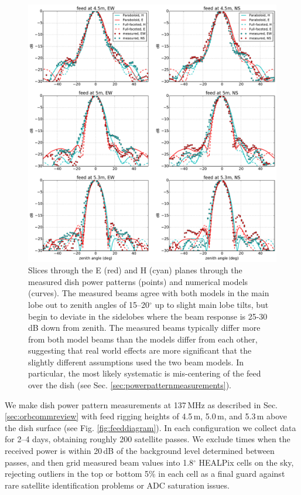 \begin{figure}[t]
\centering
\includegraphics[width=6in]{chap3_hera_beammapping/measured_beams_and_models_slices.pdf}
\caption[Slices through the E (red) and H (cyan) planes through the measured dish power patterns (points) and numerical models (curves).]{Slices through the E (red) and H (cyan) planes through the measured dish power patterns (points) and numerical models (curves). The measured beams agree with both models in the main lobe out to zenith angles of 15--20$^\circ$ up to slight main lobe tilts, but begin to deviate in the sidelobes where the beam response is 25-30\,dB down from zenith. The measured beams typically differ more from both model beams than the models differ from each other, suggesting that real world effects are more significant that the slightly different assumptions used the two beam models. In particular, the most likely systematic is mis-centering of the feed over the dish (see Sec. \ref{sec:powerpatternmeasurements}).}
\label{fig:measuredbeamslices}
\end{figure}

We make dish power pattern measurements at 137\,MHz as described in Sec. \ref{sec:orbcommreview} with feed rigging heights of 4.5\,m, 5.0\,m, and 5.3\,m above the dish surface (see Fig. \ref{fig:feeddiagram}). In each configuration we collect data for 2--4 days, obtaining roughly 200 satellite passes. We exclude times when the received power is within 20\,dB of the background level determined between passes, and then grid measured beam values into 1.8$^\circ$ HEALPix cells on the sky, rejecting outliers in the top or bottom 5\% in each cell as a final guard against rare satellite identification problems or ADC saturation issues.

